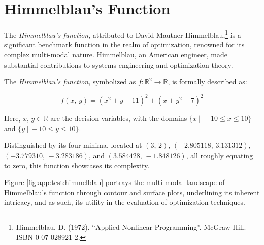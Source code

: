 \section{Himmelblau's Function}
\label{sec:app:test:himmelblau}
  The \emph{Himmelblau's function}, attributed to David Mautner 
  Himmelblau,\footnote{%
    Himmelblau, D. (1972). \enquote{Applied Nonlinear Programming}. McGraw-Hill. 
    ISBN 0-07-028921-2.
  } is a significant benchmark function in the realm of optimization, renowned
  for its complex multi-modal nature.
  Himmelblau, an American engineer, made substantial contributions to systems
  engineering and optimization theory.

  \begin{definition}
    \label{def:app:test:himmelblau}
    The \emph{Himmelblau's function}, symbolized as \(f: \mathbb{R}^2 \rightarrow 
    \mathbb{R}\), is formally described as:

    \begin{equation}
      \label{eq:app:test:himmelblau}
      f(x,\, y) = (x^2 + y - 11)^2 + (x + y^2 - 7)^2
    \end{equation}
    
    Here, \(x,\, y \in \mathbb{R}\) are the decision variables, with the domains 
    \(\{x\: |\: -10 \leq x \leq 10\}\) and \(\{y\: |\: -10 \leq y \leq 10\}\).
  \end{definition}

  Distinguished by its four minima, located at \((3,\, 2)\), \((-2.805118,\, 
  3.131312)\), \((-3.779310,\, -3.283186)\), and \((3.584428,\, -1.848126)\), 
  all roughly equating to zero, this function showcases its complexity.

  Figure \ref{fig:app:test:himmelblau} portrays the multi-modal landscape of 
  Himmelblau's function through contour and surface plots, underlining its 
  inherent intricacy, and as such, its utility in the evaluation of optimization
  techniques.

